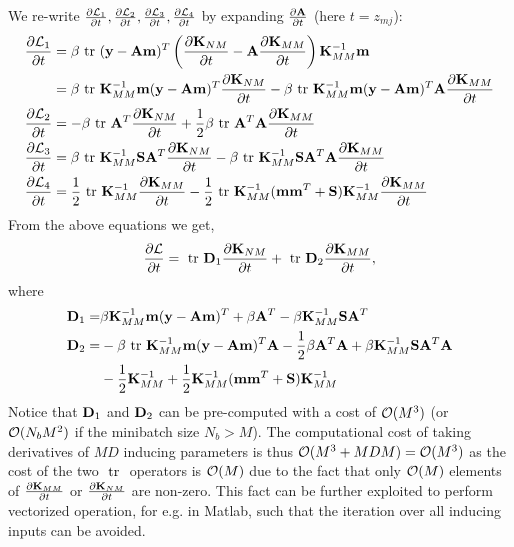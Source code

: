 \noindent We re-write $\deriv{\calL_1}{t}, \deriv{\calL_2}{t}, \deriv{ \calL_3}{t}, \deriv{\calL_4}{t}$ by expanding $\deriv{\A}{t}$ (here $t = z_{mj}$):
\begin{align}
\nonumber
\deriv{\calL_1}{t}
 &= \beta \trace (\y - \A\m)^T \left(\deriv{\K_{NM}}{t} -  \A \deriv{ \K_{MM}}{t}\right)\K_{MM}^{-1} \m \\
&= \beta \trace \K_{MM}^{-1} \m (\y - \A\m)^T \deriv{\K_{NM}}{t} 
-\beta \trace \K_{MM}^{-1} \m (\y - \A\m)^T \A \deriv{\K_{MM}}{t} \\
\deriv{\calL_2}{t}
&= - \beta \trace \A^T \deriv{\K_{NM}}{t}
 + \frac{1}{2} \beta \trace \A^T \A \deriv{\K_{MM}}{t}  \\
\deriv{\calL_3}{t}
&= \beta \trace \K_{MM}^{-1} \S \A^T \deriv{\K_{NM}}{t}
 - \beta \trace \K_{MM}^{-1} \S \A^T \A \deriv{\K_{MM}}{t}\\
\deriv{\calL_4}{t}
 &= \frac{1}{2}  \trace \K_{MM}^{-1} \deriv{\K_{MM}}{t}
  - \frac{1}{2} \trace \K_{MM}^{-1} (\m \m^T + \S) \K_{MM}^{-1} \deriv{\K_{MM}}{t} 
\end{align}
From the above equations we get,
\begin{align}
\deriv{\calL}{t} = \trace \D_1 \deriv{\K_{NM}}{t} + \trace \D_2 \deriv{ \K_{MM}}{t},
\end{align}
where 
\begin{align}
\D_1 =& \beta \K_{MM}^{-1} \m (\y - \A\m)^T
 + \beta \A^T
 - \beta \K_{MM}^{-1} \S \A^T \\ \nonumber
\D_2 =& -\beta \trace \K_{MM}^{-1} \m (\y - \A\m)^T \A
 - \frac{1}{2} \beta \A^T \A
  + \beta \K_{MM}^{-1} \S \A^T \A	 \\ 
  &-\frac{1}{2} \K_{MM}^{-1} + \frac{1}{2} \K_{MM}^{-1} (\m \m^T + \S) \K_{MM}^{-1}
\end{align}
Notice that $\D_1$ and $\D_2$ can be pre-computed with a cost of $\calO(M^3)$ (or $\calO(N_bM^2)$ if the minibatch size $N_b > M$).
The computational cost of taking derivatives of $MD$ inducing parameters is thus $\calO(M^3 + MDM) = \calO(M^3)$ as the cost of the two $\trace$ operators is $\calO(M)$ due to the fact that only $\calO(M)$ elements of $\deriv{\K_{MM}}{t}$ or $\deriv{\K_{NM}}{t}$ are non-zero.
This fact can be further exploited to perform vectorized operation, for e.g. in Matlab, such that the iteration over all inducing inputs can be avoided.

